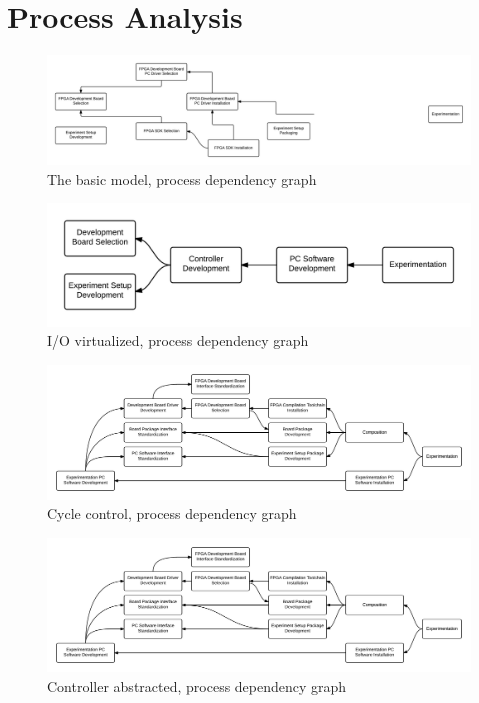 \documentclass[main.tex]{subfiles}
\begin{document}
\chapter{Process Analysis}

\begin{figure}[h]
\centering
\includegraphics[width=\textwidth]{img/processes-dependencies-basic}
\caption{The basic model, process dependency graph}
\label{fig:dependencies-basic}
\end{figure}

\begin{figure}[h]
\centering
\includegraphics[width=\textwidth]{img/processes-dependencies-inout}
\caption{I/O virtualized, process dependency graph}
\label{fig:dependencies-inout}
\end{figure}

\begin{landscape}
\begin{figure}
\centering
\includegraphics[width=\hsize]{img/processes-dependencies-control}
\caption{Cycle control, process dependency graph}
\label{fig:dependencies-control}
\end{figure}
\end{landscape}

\begin{landscape}
\begin{figure}
\centering
\includegraphics[width=\hsize]{img/processes-dependencies-abstract}
\caption{Controller abstracted, process dependency graph}
\label{fig:dependencies-abstract}
\end{figure}
\end{landscape}
\end{document}
